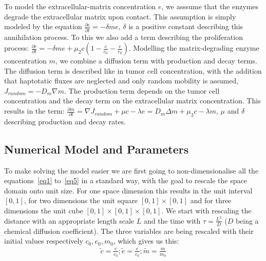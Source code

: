 To model the extracellular-matrix concentration $e$, we asssume that the enzymes degrade the extracellular matrix upon contact. This assumption is simply modeled by the equation $\frac{\partial e}{\partial t} = -\delta m e$, $\delta$ is a positive constant describing this annihilation process. To this we also add a term describing the proliferation process: $\frac{\partial e}{\partial t} = -\delta m e + \mu_2 c (1 - \frac{c}{c_0} - \frac{e}{e_0})$.\newline 
Modelling the matrix-degrading enzyme concentration $m$, we combine a diffusion term with production and decay terms. The diffusion term is described like in tumor cell concentration, with the addition that haptotatic fluxes are neglected and only random mobility is assumed, $J_{random} = -D_m \nabla m$. The production term depends on the tumor cell concentration and the decay term on the extracellular matrix concentration. This results in the term: $\frac{\partial m}{\partial t} = \nabla J_{random} + \mu c - \lambda e = D_m \Delta m + \mu_3 c - \lambda m$, $\mu$ and $\delta$ describing production and decay rates.


\subsection{Numerical Model and Parameters}

To make solving the model easier we are first going to non-dimensionalise all the equations~\ref{eq1} to~\ref{eq5} in a standard way, with the goal to rescale the space domain onto unit size. For one space dimension this results in the unit interval $[0,1]$, for two dimensions the unit square $[0,1] \times [0,1]$ and for three dimensions the unit cube $[0,1] \times [0,1] \times [0,1]$. 
We start with rescaling the distance with an appropriate length scale $L$ and the time with $\tau = \frac{L^2}{D}$ ($D$ being a chemical diffusion coefficient). The three variables are being rescaled with their initial values respectively $c_0, e_0, m_0$, which gives us this:
\begin{align*}
    \tilde{c} = \frac{c}{c_0};  \tilde{e} = \frac{e}{e_0};  \tilde{m} = \frac{m}{m_0}  
\end{align*}


